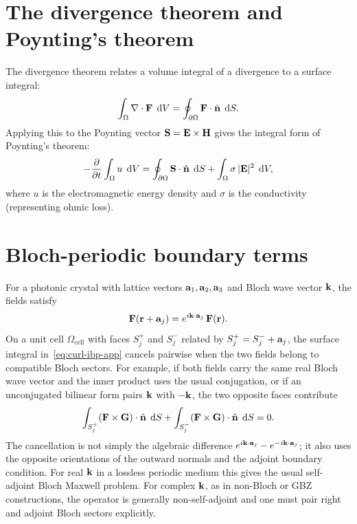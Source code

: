 \section{The divergence theorem and Poynting's theorem}
\label{sec:divergence-poynting}

The divergence theorem relates a volume integral of a divergence to a
surface integral:
\begin{equation}
 \int_\Omega \divg\FF\;\dd V
 = \oint_{\partial\Omega} \FF\cdot\nn\;\dd S.
 \label{eq:divergence-theorem}
\end{equation}
Applying this to the Poynting vector
$\SS = \EE\times\HH$ gives the integral form of Poynting's theorem:
\begin{equation}
 -\pdv{}{t}\int_\Omega u\;\dd V
 = \oint_{\partial\Omega} \SS\cdot\nn\;\dd S
 + \int_\Omega \sigma\,|\EE|^2\;\dd V,
 \label{eq:poynting-integral}
\end{equation}
where $u$ is the electromagnetic energy density and $\sigma$ is the
conductivity (representing ohmic loss).


\section{Bloch-periodic boundary terms}
\label{sec:bloch-boundary}

For a photonic crystal with lattice vectors $\aa_1, \aa_2, \aa_3$ and
Bloch wave vector $\kk$, the fields satisfy
\begin{equation}
 \FF(\rr + \aa_j) = e^{i\kk\cdot\aa_j}\,\FF(\rr).
 \label{eq:bloch-bc}
\end{equation}
On a unit cell $\Omega_{\mathrm{cell}}$ with faces $S_j^+$ and $S_j^-$
related by $S_j^+ = S_j^- + \aa_j$, the surface integral
in~\eqref{eq:curl-ibp-app} cancels pairwise when the two fields belong
to compatible Bloch sectors. For example, if both fields carry the same
real Bloch wave vector and the inner product uses the usual conjugation,
or if an unconjugated bilinear form pairs $\kk$ with $-\kk$, the two
opposite faces contribute
\begin{equation}
 \int_{S_j^+}(\FF\times\GG)\cdot\nn\;\dd S
 + \int_{S_j^-}(\FF\times\GG)\cdot\nn\;\dd S = 0 .
 \label{eq:bloch-surface-cancel}
\end{equation}
The cancellation is not simply the algebraic difference
$e^{i\kk\cdot\aa_j}-e^{-i\kk\cdot\aa_j}$; it also uses the opposite
orientations of the outward normals and the adjoint boundary condition.
For real $\kk$ in a lossless periodic medium this gives the usual
self-adjoint Bloch Maxwell problem. For complex $\kk$, as in non-Bloch
or GBZ constructions, the operator is generally non-self-adjoint and
one must pair right and adjoint Bloch sectors explicitly.


